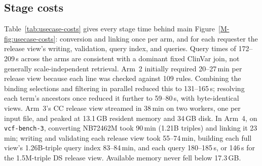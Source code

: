 \documentclass[11pt]{article}
\begin{document}
\subsection{Stage costs}\label{subsec:usecase-costs}
Table~\ref{tab:usecase-costs} gives every stage time behind main Figure~\ref{M-fig:usecase-costs}: conversion and linking once per arm, and for each requester the release view's writing, validation, query index, and queries.
Query times of 172--209\,s across the arms are consistent with a dominant fixed ClinVar join, not generally scale-independent retrieval.
Arm~2 initially required 20--27\,min per release view because each line was checked against 109 rules.
Combining the binding selections and filtering in parallel reduced this to 131--165\,s; resolving each term's ancestors once reduced it further to 59--80\,s, with byte-identical views.
Arm~3's CC release view streamed in 38\,min on two workers, one per input file, and peaked at 13.1\,GB resident memory and 34\,GB disk.
In Arm~4, on \texttt{vcf-bench-3}, converting NB72462M took 90\,min (1.21B triples) and linking it 23\,min; writing and validating each release view took 55--74\,min, building each full view's 1.26B-triple query index 83--84\,min, and each query 180--185\,s, or 146\,s for the 1.5M-triple DS release view.
Available memory never fell below 17.3\,GB.
\end{document}
